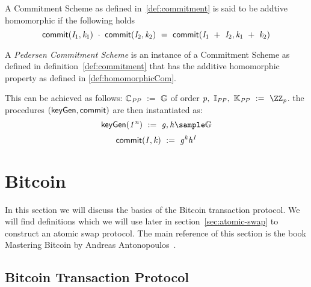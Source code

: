 \begin{definition}\label{def:homomorphicCom}
    A Commitment Scheme as defined in~\ref{def:commitment} is said to be addtive homomorphic if the following holds \cite{bunz2018bulletproofs}
    \[ \mathsf{commit}(\mathit{I}_1, \mathit{k}_1) ~\cdot~ \mathsf{commit}(\mathit{I}_2, \mathit{k}_2) ~=~ \mathsf{commit}(\mathit{I}_1 ~+~ \mathit{I}_2, \mathit{k}_1 ~+~ \mathit{k}_2) \]
\end{definition}

\begin{definition}\label{def:pedersenCom}
    A \emph{Pedersen Commitment Scheme} is an instance of a Commitment Scheme as defined in definition~\ref{def:commitment} that has the additive homomorphic property as defined in \ref{def:homomorphicCom}.

This can be achieved as follows:
    $\mathbb{C}_{\mathit{PP}} ~:=~ \mathbb{G}$ of order $\varPrime \opSeperate \varInputSpace_{\varPublicParam} \opSeperate \varRandSpace_{\varPublicParam} \opAssign \cnstIntegersPrime{\varPrime}$.
    the procedures $(\mathsf{keyGen}, \mathsf{commit})$ are then instantiated as:
    \[ \procSetup{\varSecParam} \opAssign \varG, \varH \sample \cnstGroup\]
    \[ \mathsf{commit}(\mathit{I}, \mathit{k}) ~:=~ \mathit{g}^{\mathit{k}} \mathit{h}^{\mathit{I}} \]

\end{definition}


\section{Bitcoin\label{sec:pre:bitcoin}}

In this section we will discuss the basics of the Bitcoin transaction protocol.
We will find definitions which we will use later in section~\ref{sec:atomic-swap} to construct an atomic swap protocol.
The main reference of this section is the book Mastering Bitcoin by Andreas Antonopoulos~\cite{antonopoulos2014mastering}.

\subsection{Bitcoin Transaction Protocol}\label{subsec:bitcointx}


